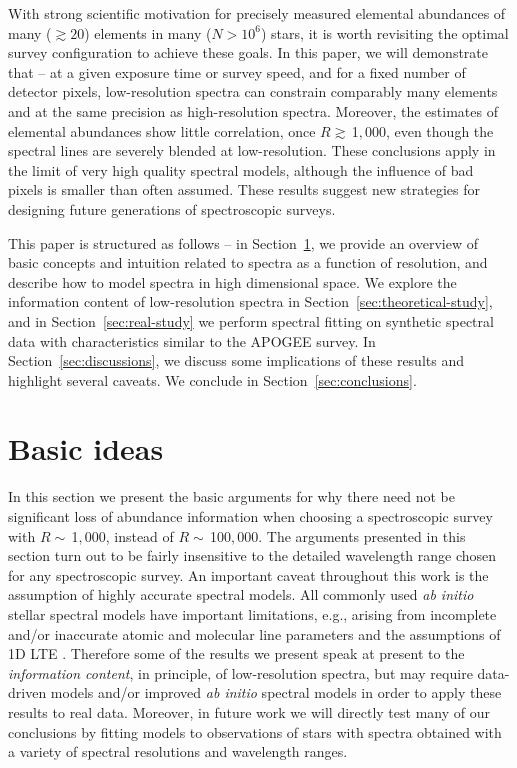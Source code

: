 \documentclass[iop]{emulateapj}
\begin{document}
\begin{CJK*}{UTF8}{gbsn}
With strong scientific motivation for precisely measured elemental abundances of many ($\gtrsim20$) elements in many ($N>10^6$) stars, it is worth revisiting the optimal survey configuration to achieve these goals. In this paper, we will demonstrate that -- at a given exposure time or survey speed, and for a fixed number of detector pixels, low-resolution spectra can constrain comparably many elements and at the same precision as high-resolution spectra. Moreover, the estimates of elemental abundances show little correlation, once $R \gtrsim \,$1$,$000, even though the spectral lines are severely blended at low-resolution. These conclusions apply in the limit of very high quality spectral models, although the influence of bad pixels is smaller than often assumed. These results suggest new strategies for designing future generations of spectroscopic surveys.

This paper is structured as follows -- in Section~\ref{sec:basic-ideas}, we provide an overview of basic concepts and intuition related to spectra as a function of resolution, and describe how to model spectra in high dimensional space. We explore the information content of low-resolution spectra in Section~\ref{sec:theoretical-study}, and in Section~\ref{sec:real-study} we perform spectral fitting on synthetic spectral data with characteristics similar to the APOGEE survey. In Section~\ref{sec:discussions}, we discuss some implications of these results and highlight several caveats. We conclude in Section~\ref{sec:conclusions}.


%
%
%
%
%
%

\vspace{1cm}
\section{Basic ideas}
\label{sec:basic-ideas}

In this section we present the basic arguments for why there need not be significant loss of abundance information when choosing a spectroscopic survey with $R \sim \,$1$,$000, instead of $R \sim \,$100$,$000. The arguments presented in this section turn out to be fairly insensitive to the detailed wavelength range chosen for any spectroscopic survey. An important caveat throughout this work is the assumption of highly accurate spectral models. All commonly used {\it ab initio} stellar spectral models \citep[e.g.,][]{kur96,kur03,kur05,hau99,gus08} have important limitations, e.g., arising from incomplete and/or inaccurate atomic and molecular line parameters and the assumptions of 1D LTE \citep[see also][]{smi14}.  Therefore some of the results we present speak at present to the {\it information content}, in principle, of low-resolution spectra, but may require data-driven models \citep{nes15a,cas16} and/or improved {\it ab initio} spectral models in order to apply these results to real data. Moreover, in future work we will directly test many of our conclusions by fitting models to observations of stars with spectra obtained with a variety of spectral resolutions and wavelength ranges.



\end{CJK*}
\end{document}
